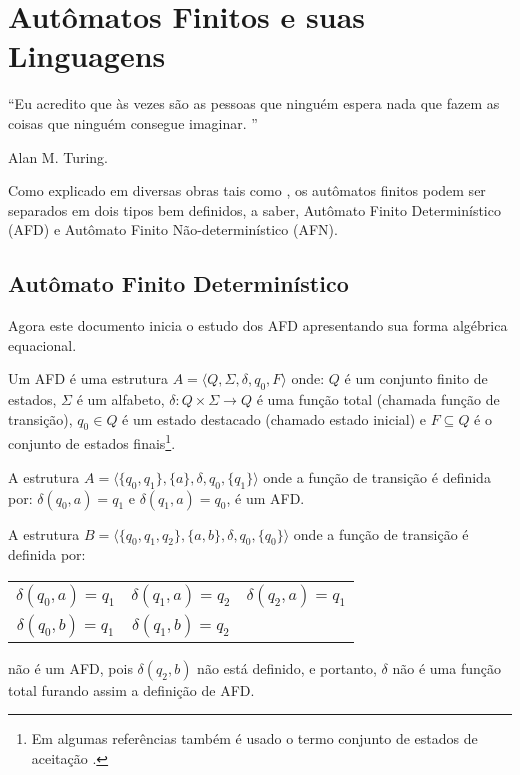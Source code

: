 \chapter{Autômatos Finitos e suas Linguagens}\label{cap:Automata}

\epigraph{``Eu acredito que às vezes são as pessoas que ninguém espera nada que fazem as coisas que ninguém consegue imaginar. ''}{Alan M. Turing.}

Como explicado em diversas obras tais como \cite{benjaLivro2010, hopcroft2008, linz2006, menezes1998LFA}, os autômatos finitos podem ser separados em dois tipos bem definidos, a saber, Autômato Finito Determinístico (AFD) e Autômato Finito Não-determinístico (AFN).

\section{Autômato Finito Determinístico}\label{subsec:AFD}

Agora este documento inicia o estudo dos AFD apresentando sua forma algébrica equacional.

\begin{definicao}\label{def:AFD}
	Um AFD é uma estrutura $A = \langle Q, \Sigma, \delta, q_0, F\rangle$ onde: $Q$ é um conjunto finito de estados, $\Sigma$ é um alfabeto, $\delta : Q \times \Sigma \rightarrow Q$ é uma função total (chamada função de transição), $q_0 \in Q$ é um estado destacado (chamado estado inicial) e $F \subseteq Q$ é o conjunto de estados finais\footnote{Em algumas referências também é usado o termo conjunto de estados de aceitação \cite{de2010}.}.
\end{definicao}

\begin{exemplo}\label{exe:AFD}
	A estrutura $A = \langle \{q_0, q_1\}, \{a\}, \delta, q_0, \{q_1\} \rangle$ onde a função de transição é definida por: $\delta(q_0, a) = q_1$ e $\delta(q_1, a) = q_0$, é um AFD.
\end{exemplo}


\begin{exemplo}\label{exe:NaoEAFD}
	A estrutura $B = \langle \{q_0, q_1, q_2\}, \{a, b\}, \delta, q_0, \{q_0\} \rangle$ onde a função de transição é definida por:
	\begin{table*}[H]
		\centering
		\begin{tabular}{ccc}
			$\delta(q_0, a) = q_1$ & $\delta(q_1, a) = q_2$ & $\delta(q_2, a) = q_1$\\
			$\delta(q_0, b) = q_1$ & $\delta(q_1, b) = q_2$ & 
		\end{tabular}
	\end{table*}

	\noindent não é um AFD, pois $\delta(q_2, b)$ não está definido, e portanto, $\delta$ não é uma função total furando assim a definição de AFD.
\end{exemplo}

